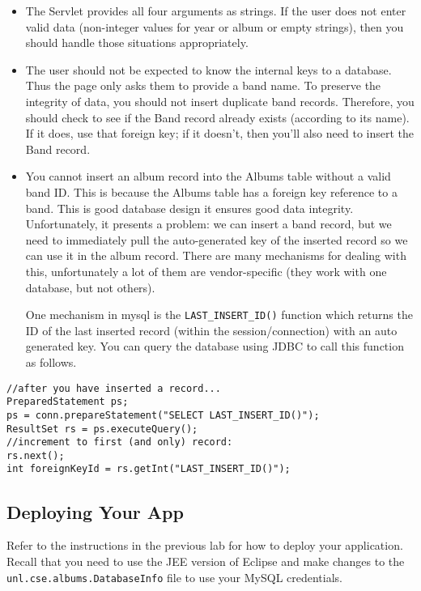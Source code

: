 \documentclass[12pt]{scrartcl}
\begin{document}
\begin{itemize}
  \item The Servlet provides all four arguments as strings.  If the
  	user does not enter valid data (non-integer values for year or
	album or empty strings), then you should handle those situations
	appropriately.
  \item The user should not be expected to know the internal keys to 
    a database.  Thus the page only asks them to provide a band name.  
    To preserve the integrity of data, you should not insert duplicate 
    band records.  Therefore, you should check to see if the Band record 
    already exists (according to its name).  If it does, use that foreign 
    key; if it doesn't, then you'll also need to insert the Band record.
  \item You cannot insert an album record into the Albums table 
    without a valid band ID.  This is because the Albums table has a 
    foreign key reference to a band.  This is good database design it 
    ensures good data integrity.  Unfortunately, it presents a problem: 
    we can insert a band record, but we need to immediately pull the 
    auto-generated key of the inserted record so we can use it in the 
    album record.  There are many mechanisms for dealing with this, 
    unfortunately a lot of them are vendor-specific (they work with one 
    database, but not others).
    
    One mechanism in mysql is the \texttt{LAST_INSERT_ID()} 
    function which returns the ID of the last inserted record (within the
    session/connection) with an auto generated key.  You can query the 
    database using JDBC to call this function as follows.
\end{itemize}
    
\begin{verbatim}
//after you have inserted a record...
PreparedStatement ps;
ps = conn.prepareStatement("SELECT LAST_INSERT_ID()");
ResultSet rs = ps.executeQuery();
//increment to first (and only) record:
rs.next();
int foreignKeyId = rs.getInt("LAST_INSERT_ID()");
\end{verbatim}

\subsection*{Deploying Your App}

Refer to the instructions in the previous lab for how to 
deploy your application.  Recall that
you need to use the JEE version of Eclipse and make changes
to the \texttt{unl.cse.albums.DatabaseInfo} file
to use your MySQL credentials.
\end{document}
